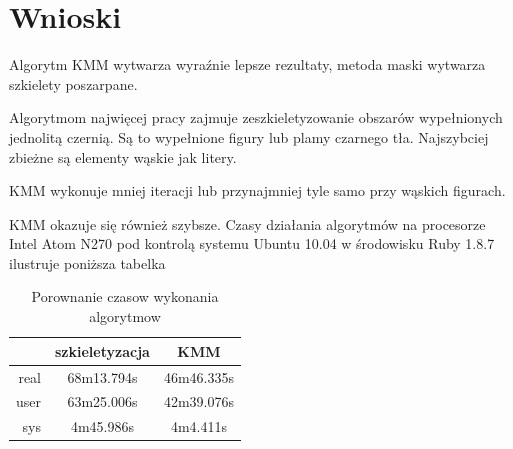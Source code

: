 \documentclass[a4paper,12pt]{article}
\begin{document}
\newpage	
\section{Wnioski}
Algorytm KMM wytwarza wyraźnie lepsze rezultaty, metoda maski wytwarza szkielety poszarpane.

Algorytmom najwięcej pracy zajmuje zeszkieletyzowanie obszarów wypełnionych jednolitą czernią. Są to wypełnione figury lub plamy czarnego tła. Najszybciej zbieżne są elementy wąskie jak litery.

KMM wykonuje mniej iteracji lub przynajmniej tyle samo przy wąskich figurach.

KMM okazuje się również szybsze. Czasy działania algorytmów na procesorze Intel Atom N270 pod kontrolą systemu Ubuntu 10.04 w środowisku Ruby 1.8.7 ilustruje poniższa tabelka

\begin{table}[h!]
\centering
\begin{tabular}{|r|c|c|}
  \hline 
  & szkieletyzacja & KMM \\
  \hline 
  real & 68m13.794s & 46m46.335s\\
  \hline
  user & 63m25.006s & 42m39.076s \\
  \hline
  sys & 4m45.986s & 4m4.411s \\
  \hline
\end{tabular} 
\caption{Porownanie czasow wykonania algorytmow}
\end{table}
\end{document}
